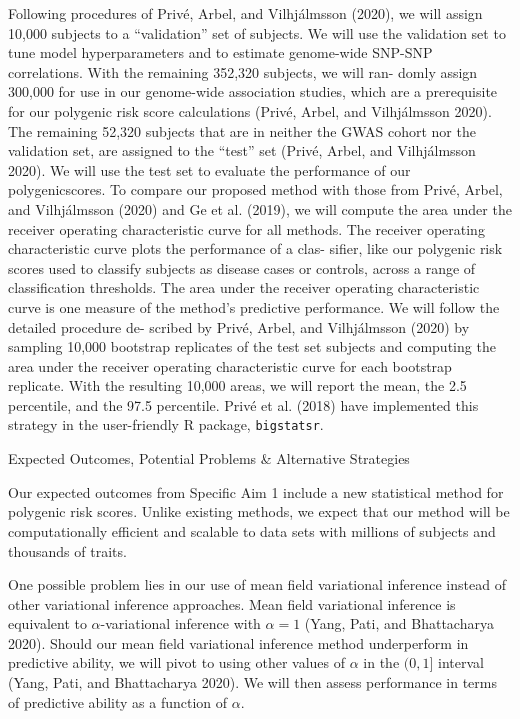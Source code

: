\documentclass[
  11pt,
  letterpaper,
  DIV=11,
  numbers=noendperiod]{scrartcl}
\begin{document}
Following procedures of Privé, Arbel, and Vilhjálmsson (2020), we will
assign 10,000 subjects to a ``validation'' set of subjects. We will use
the validation set to tune model hyperparameters and to estimate
genome-wide SNP-SNP correlations. With the remaining 352,320 subjects,
we will ran- domly assign 300,000 for use in our genome-wide association
studies, which are a prerequisite for our polygenic risk score
calculations (Privé, Arbel, and Vilhjálmsson 2020). The remaining 52,320
subjects that are in neither the GWAS cohort nor the validation set, are
assigned to the ``test'' set (Privé, Arbel, and Vilhjálmsson 2020). We
will use the test set to evaluate the performance of our
polygenicscores. To compare our proposed method with those from Privé,
Arbel, and Vilhjálmsson (2020) and Ge et al. (2019), we will compute the
area under the receiver operating characteristic curve for all methods.
The receiver operating characteristic curve plots the performance of a
clas- sifier, like our polygenic risk scores used to classify subjects
as disease cases or controls, across a range of classification
thresholds. The area under the receiver operating characteristic curve
is one measure of the method's predictive performance. We will follow
the detailed procedure de- scribed by Privé, Arbel, and Vilhjálmsson
(2020) by sampling 10,000 bootstrap replicates of the test set subjects
and computing the area under the receiver operating characteristic curve
for each bootstrap replicate. With the resulting 10,000 areas, we will
report the mean, the 2.5 percentile, and the 97.5 percentile. Privé et
al. (2018) have implemented this strategy in the user-friendly R
package, \texttt{bigstatsr}.

Expected Outcomes, Potential Problems \& Alternative Strategies

Our expected outcomes from Specific Aim 1 include a new statistical
method for polygenic risk scores. Unlike existing methods, we expect
that our method will be computationally efficient and scalable to data
sets with millions of subjects and thousands of traits.

One possible problem lies in our use of mean field variational inference
instead of other variational inference approaches. Mean field
variational inference is equivalent to \(\alpha\)-variational inference
with \(\alpha = 1\) (Yang, Pati, and Bhattacharya 2020). Should our mean
field variational inference method underperform in predictive ability,
we will pivot to using other values of \(\alpha\) in the \((0, 1]\)
interval (Yang, Pati, and Bhattacharya 2020). We will then assess
performance in terms of predictive ability as a function of \(\alpha\).
\end{document}
